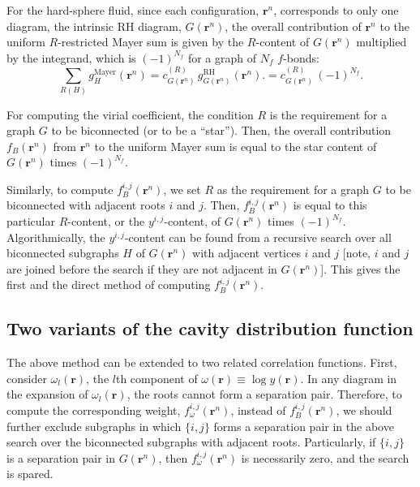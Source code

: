 \documentclass[aip,jcp,preprint,superscriptaddress,showpacs,preprintnumbers,amsmath,amssymb]{revtex4-1}
\numberwithin{equation}{section}
\newcommand{\vct}[1]{\mathbf{#1}}
\providecommand{\vr}{} %
\renewcommand{\vr}{\vct{r}}
\begin{document}
For the hard-sphere fluid,
since each configuration, $\vr^n$,
corresponds to only one diagram,
the intrinsic RH diagram, $G(\vr^n)$,
the overall contribution of $\vr^n$
to the uniform $R$-restricted Mayer sum
is given by the $R$-content of $G(\vr^n)$
multiplied by the integrand,
which is $(-1)^{N_f}$ for a graph of $N_f$ $f$-bonds:
%
%
%
\[
\sum_{ R(H) }
g_H^\mathrm{Mayer}(\vr^n)
=
c_{G(\vr^n)}^{(R)} \,
g_{G(\vr^n)}^\mathrm{RH}(\vr^n).
=
c_{G(\vr^n)}^{(R)} \,
(-1)^{N_f}.
\]



For computing the virial coefficient,
the condition $R$ is the requirement for a graph $G$
to be biconnected (or to be a ``star'').
%
Then, the overall contribution $f_B(\vr^n)$ from $\vr^n$
to the uniform Mayer sum is equal to
the star content of $G(\vr^n)$ times $(-1)^{N_f}$.



Similarly,
to compute $f_B^{i,j}(\vr^n)$,
we set $R$ as the requirement for a graph $G$ to be biconnected
with adjacent roots $i$ and $j$.
%
Then,
$f_B^{i,j}(\vr^n)$
is equal to this particular $R$-content,
or the $y^{i,j}$-content,
of $G(\vr^n)$ times $(-1)^{N_f}$.
%
Algorithmically,
the $y^{i,j}$-content can be found
from a recursive search over all biconnected subgraphs $H$
of $G(\vr^n)$ with adjacent vertices $i$ and $j$
[note, $i$ and $j$ are joined before the search
if they are not adjacent in $G(\vr^n)$].
%
This gives the first and the direct method of
computing $f_B^{i,j}(\vr^n)$.





\subsection{Two variants of the cavity distribution function}





The above method can be extended to
two related correlation functions.
%
First,
consider $\omega_l(\vr)$,
the $l$th component of $\omega(\vr) \equiv \log y(\vr)$.
%
%
In any diagram in the expansion of $\omega_l(\vr)$,
the roots cannot form a separation pair.
%
Therefore, to compute the corresponding weight,
$f_\omega^{i,j}(\vr^n)$,
instead of $f_B^{i,j}(\vr^n)$,
we should further exclude subgraphs in which $\{i,j\}$
forms a separation pair in the above search over
the biconnected subgraphs with adjacent roots.
%
Particularly,
if $\{i, j\}$ is a separation pair in $G(\vr^n)$,
then $f_\omega^{i,j}(\vr^n)$ is necessarily zero,
and the search is spared.
\end{document}
